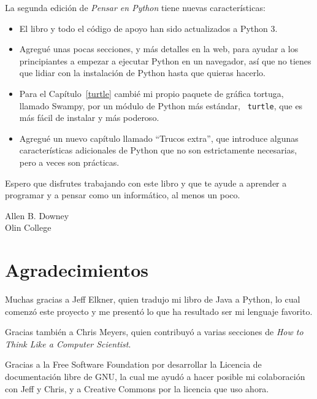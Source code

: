\documentclass[10pt]{book}
\begin{document}
La segunda edición de {\em Pensar en Python} tiene nuevas características:

\begin{itemize}

\item El libro y todo el código de apoyo han sido actualizados a Python 3.

\item Agregué unas pocas secciones, y más detalles en la web, para ayudar a
los principiantes a empezar a ejecutar Python en un navegador, así que no
tienes que lidiar con la instalación de Python hasta que quieras hacerlo.

\item Para el Capítulo~\ref{turtle} cambié mi propio paquete de gráfica
  tortuga, llamado Swampy, por un módulo de Python más estándar, {\tt
    turtle}, que es más fácil de instalar y más poderoso.

\item Agregué un nuevo capítulo llamado ``Trucos extra'', que introduce
algunas características adicionales de Python que no son estrictamente
necesarias, pero a veces son prácticas.

\end{itemize}

Espero que disfrutes trabajando con este libro y que te ayude a aprender
a programar y a pensar como un informático, al menos un poco.


Allen B. Downey \\

Olin College \\


\section*{Agradecimientos}

Muchas gracias a Jeff Elkner, quien
tradujo mi libro de Java a Python, lo cual comenzó este
proyecto y me presentó lo que ha resultado ser mi
lenguaje favorito.

Gracias también a Chris Meyers, quien contribuyó a varias secciones
de {\em How to Think Like a Computer Scientist}.

Gracias a la Free Software Foundation por desarrollar
la Licencia de documentación libre de GNU, la cual me ayudó
a hacer posible mi colaboración con Jeff y Chris, y a Creative
Commons por la licencia que uso ahora.
\end{document}

